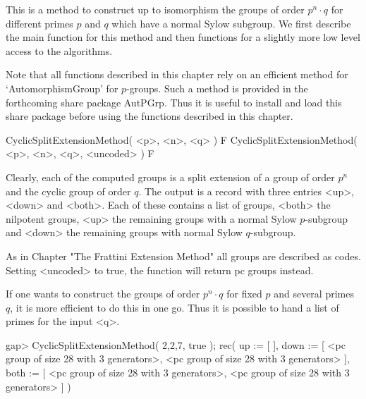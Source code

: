 


This is a method to construct up to isomorphism the groups of order
$p^n \cdot q$ for different primes $p$ and $q$ which have a normal
Sylow subgroup. We first describe the main function for this method
and then functions for a slightly more low level access to the
algorithms. 

Note that all functions described in this chapter rely on an
efficient method for `AutomorphismGroup' for $p$-groups. Such
a method is provided in the forthcoming share package AutPGrp. 
Thus it is useful to install and load this share package before
using the functions described in this chapter.


\> CyclicSplitExtensionMethod( <p>, <n>, <q> ) F
\> CyclicSplitExtensionMethod( <p>, <n>, <q>, <uncoded> ) F

Clearly, each of the computed groups is a split extension of a group
of order $p^n$ and the cyclic group of order $q$. The output is a
record with three entries <up>, <down> and <both>. Each of these 
contains a list of groups, <both> the nilpotent groups, <up> the 
remaining groups with a normal Sylow $p$-subgroup and <down> the
remaining groups with normal Sylow $q$-subgroup.

As in Chapter "The Frattini Extension Method" all groups are
described as codes. Setting <uncoded> to true, the function
will return pc groups instead.

If one wants to construct the groups of order $p^n \cdot q$
for fixed $p$ and several primes $q$, it is more efficient to
do this in one go. Thus it is possible to hand a list of primes
for the input <q>.

\beginexample
gap> CyclicSplitExtensionMethod( 2,2,7, true );    
rec( up := [  ], 
  down  := [ <pc group of size 28 with 3 generators>, 
             <pc group of size 28 with 3 generators> ], 
  both  := [ <pc group of size 28 with 3 generators>, 
             <pc group of size 28 with 3 generators> ] )

